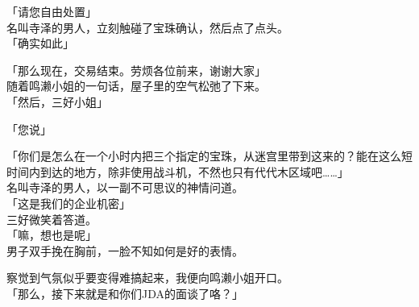 「请您自由处置」\\

名叫寺泽的男人，立刻触碰了宝珠确认，然后点了点头。\\

「确实如此」

「那么现在，交易结束。劳烦各位前来，谢谢大家」\\

随着鸣濑小姐的一句话，屋子里的空气松弛了下来。\\

「然后，三好小姐」

「您说」

「你们是怎么在一个小时内把三个指定的宝珠，从迷宫里带到这来的？能在这么短时间内到达的地方，除非使用战斗机，不然也只有代代木区域吧……」\\

名叫寺泽的男人，以一副不可思议的神情问道。\\

「这是我们的企业机密」\\

三好微笑着答道。\\

「嘛，想也是呢」\\

男子双手挽在胸前，一脸不知如何是好的表情。

察觉到气氛似乎要变得难搞起来，我便向鸣濑小姐开口。\\

「那么，接下来就是和你们JDA的面谈了咯？」

